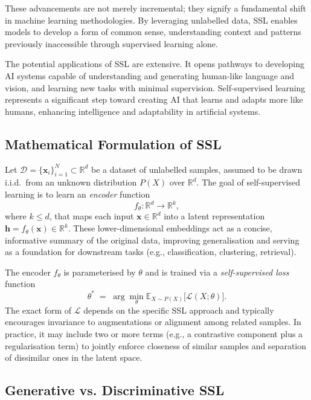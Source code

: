 These advancements are not merely incremental; they signify a fundamental shift in machine learning methodologies. By leveraging unlabelled data, SSL enables models to develop a form of common sense, understanding context and patterns previously inaccessible through supervised learning alone.

The potential applications of SSL are extensive. It opens pathways to developing AI systems capable of understanding and generating human-like language and vision, and learning new tasks with minimal supervision. Self-supervised learning represents a significant step toward creating AI that learns and adapts more like humans, enhancing intelligence and adaptability in artificial systems.


\subsection{Mathematical Formulation of SSL}

Let \(\mathcal{D} = \{\mathbf{x}_i\}_{i=1}^N \subset \mathbb{R}^d\) be a dataset of unlabelled samples, assumed to be drawn i.i.d.\ from an unknown distribution \(P(X)\) over \(\mathbb{R}^d\). The goal of self-supervised learning is to learn an \emph{encoder} function
\[
f_{\theta} : \mathbb{R}^d \to \mathbb{R}^k,
\]
where \(k \le d\), that maps each input \(\mathbf{x} \in \mathbb{R}^d\) into a latent representation \(\mathbf{h} = f_{\theta}(\mathbf{x}) \in \mathbb{R}^k\). These lower-dimensional embeddings act as a concise, informative summary of the original data, improving generalisation and serving as a foundation for downstream tasks (e.g., classification, clustering, retrieval).

The encoder \(f_{\theta}\) is parameterised by \(\theta\) and is trained via a \emph{self-supervised loss} function
\[
\theta^* \;=\; \arg\min_{\theta} \mathbb{E}_{X \sim P(X)}\!\bigl[\mathcal{L}(X; \theta)\bigr].
\]
The exact form of \(\mathcal{L}\) depends on the specific SSL approach and typically encourages invariance to augmentations or alignment among related samples. In practice, it may include two or more terms (e.g., a contrastive component plus a regularisation term) to jointly enforce closeness of similar samples and separation of dissimilar ones in the latent space.

\subsection{Generative vs. Discriminative SSL}

